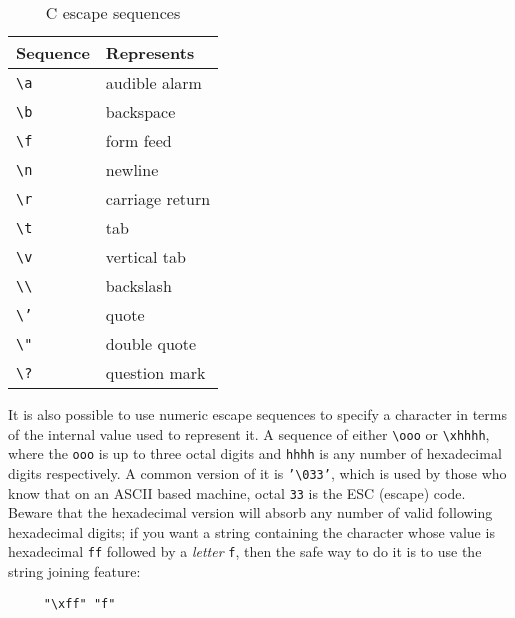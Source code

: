     \begin{table}[htb]
      \centering
      \begin{tabular}{ll}
        \toprule
        Sequence               & Represents     \\
        \midrule
        \texttt{\textbackslash a} & audible alarm    \\
        \texttt{\textbackslash b} & backspace       \\
        \texttt{\textbackslash f} & form feed       \\
        \texttt{\textbackslash n} & newline         \\
        \texttt{\textbackslash r} & carriage return \\
        \texttt{\textbackslash t} & tab             \\
        \texttt{\textbackslash v} & vertical tab    \\
        \texttt{\textbackslash\textbackslash} & backslash    \\
        \texttt{\textbackslash'} & quote            \\
        \texttt{\textbackslash"} & double quote     \\
        \texttt{\textbackslash?} & question mark    \\
        \bottomrule
      \end{tabular}
      \caption{\label{tab:escSeq}C escape sequences}
    \end{table}


   It is also possible to use numeric escape sequences to specify a
    character in terms of the internal value used to represent it. A sequence
    of either \texttt{\textbackslash ooo} or \texttt{\textbackslash xhhhh},
    where the \texttt{ooo} is up to three octal digits
    and \texttt{hhhh} is any number of hexadecimal digits
    respectively. A common version of it is \texttt{'\textbackslash 033'},
    which is used by those who know that on an ASCII based machine,
    octal \texttt{33} is the ESC (escape) code. Beware that the
    hexadecimal version will absorb any number of valid following hexadecimal
    digits; if you want a string containing the character whose value is
    hexadecimal \texttt{ff} followed by a
    \textit{letter} \texttt{f}, then the safe way to do it is to use
    the string joining feature:


   \begin{Verbatim}
     "\xff" "f"
   \end{Verbatim}


